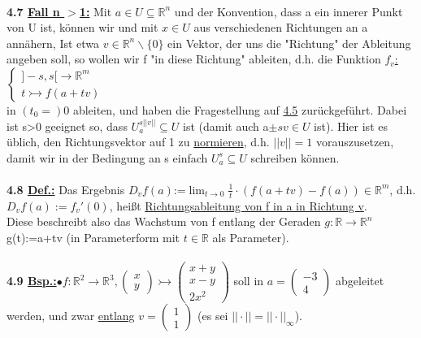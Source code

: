\documentclass[]{scrartcl}
\begin{document}
	\\
	\textbf{4.7 \underline{Fall n $>$1:}} Mit $a \in U\subseteq \mathbb{R}^n$ und der Konvention, dass a ein innerer Punkt von U ist, können wir und mit $x \in U$ aus verschiedenen Richtungen an a annähern, Ist etwa $v\in \mathbb{R}^n\backslash\{0\}$ ein Vektor, der uns die "Richtung" der Ableitung angeben soll, so wollen wir f "in diese Richtung" ableiten, d.h. die Funktion  \ul{$f_v$:}$\begin{cases}
		]-s,s[\rightarrow \mathbb{R}^m\\
		t\rightarrowtail f(a+tv)
	\end{cases}$\\ 
	in $(t_0=)0$ ableiten, und haben die Fragestellung auf \ul{4.5} zurückgeführt. Dabei ist s\textgreater0 geeignet so, dass $U_a^{s||v||}\subseteq U$ ist (damit auch a$\pm s v \in U$ ist). Hier ist es üblich, den Richtungsvektor auf 1 zu \underline{normieren}, d.h. $||v||=1$ vorauszusetzen, damit wir in der Bedingung an s einfach $U_a^s \subseteq U$ schreiben können.\\
	\\
	\textbf{4.8 \underline{Def.:}} Das Ergebnis \ul{$D_v f(a)$}:=$\lim_{t\rightarrow 0}\frac{1}{t}\cdot(f(a+tv)-f(a))\in\mathbb{R}^m$, d.h. \ul{$D_v f(a):=f_v'(0)$}, heißt \ul{Richtungsableitung von f in a in Richtung v}.\\
	Diese beschreibt also das Wachstum von f entlang der Geraden $g:\mathbb{R}\rightarrow \mathbb{R}^n$ \\
	g(t):=a+tv (in Parameterform mit $t \in \mathbb{R}$ als Parameter).\\
	\\
	\textbf{4.9 \underline{Bsp.:}}$\bullet f: \mathbb{R}^2 \rightarrow\mathbb{R}^3, \begin{pmatrix}
		x\\y
	\end{pmatrix}\rightarrowtail \begin{pmatrix}
	x+y\\x-y\\2x^2
	\end{pmatrix}$ soll in $a=\begin{pmatrix}
	-3\\4
	\end{pmatrix}$ abgeleitet werden, und zwar \underline{entlang} $v=\begin{pmatrix}
	1\\1
	\end{pmatrix}$ (es sei $||\cdot||=||\cdot||_\infty$).\\
\end{document}

